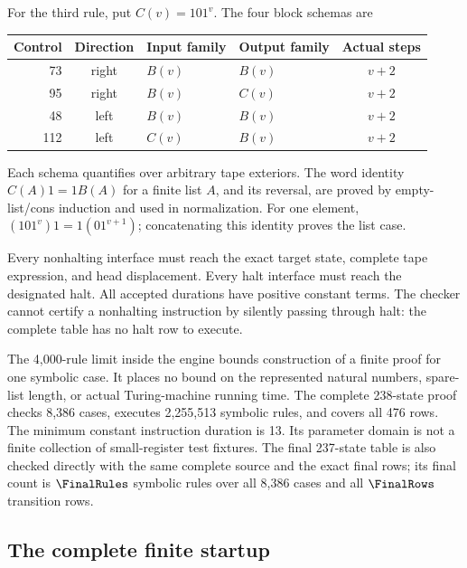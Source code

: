 \documentclass[11pt,letterpaper]{article}
\theoremstyle{definition}\newtheorem{definition}[theorem]{Definition}
\begin{document}
For the third rule, put $C(v)=101^v$.  The four block schemas are
\begin{center}
\begin{tabular}{rcllc}
\toprule
Control & Direction & Input family & Output family & Actual steps\\\midrule
73 & right & $B(v)$ & $B(v)$ & $v+2$\\
95 & right & $B(v)$ & $C(v)$ & $v+2$\\
48 & left & $B(v)$ & $B(v)$ & $v+2$\\
112 & left & $C(v)$ & $B(v)$ & $v+2$\\
\bottomrule
\end{tabular}
\end{center}
Each schema quantifies over arbitrary tape exteriors.  The word identity
$C(A)1=1B(A)$ for a finite list $A$, and its reversal, are proved by
empty-list/cons induction and used in normalization.  For one element,
$(101^v)1=1(01^{v+1})$; concatenating this identity proves the list case.

Every nonhalting interface must reach the exact target state, complete
tape expression, and head displacement.  Every halt interface must reach
the designated halt.  All accepted durations have positive constant
terms.  The checker cannot certify a nonhalting instruction by silently
passing through halt: the complete table has no halt row to execute.

The 4,000-rule limit inside the engine bounds construction of a finite
proof for one symbolic case.  It places no bound on the represented
natural numbers, spare-list length, or actual Turing-machine running time.
The complete 238-state proof checks 8,386 cases, executes 2,255,513 symbolic
rules, and covers all 476 rows.  The minimum constant instruction duration
is 13.  Its parameter domain is not a finite collection of small-register
test fixtures.
\ifFurtherReduction
The final 237-state table is also checked directly with the same complete
source and the exact final rows; its final count is $\FinalRules$
symbolic rules over all 8,386 cases and all $\FinalRows$ transition rows.
\fi

\subsection{The complete finite startup}
\end{document}
